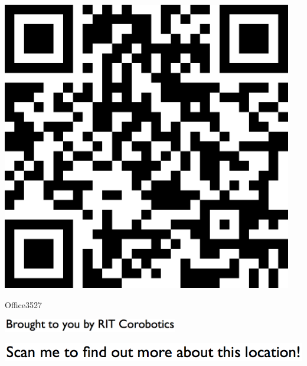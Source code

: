 \documentclass[letterpaper]{article}
\begin{document}
 \begingroup 
 \centerline{\includegraphics[scale=1,width=5in,height=5in]{Office3527.png}} 
 \endgroup 
 \vspace*{\fill} 

 \hfill{\small Office3527} 

  \vspace{0.7in} 
 
 \centerline{\includegraphics[scale=1,width=3in]{text-bottom.png}} 
 
 \pagebreak 
{} 
 \vspace*{\fill} 
 
  \centerline{\includegraphics[scale=1,width=6in]{text-top.png}} 
 
 \vspace{0.5in} 
 
\end{document}
